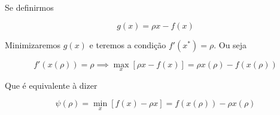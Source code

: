Se definirmos 

\[
	g(x) = \rho x - f(x)
\]

Minimizaremos $g(x)$ e teremos a condição $f'(x^*) = \rho$. Ou seja

\[
	f'(x(\rho))=\rho \implies \max_x[\rho x - f(x)] = \rho x(\rho) - f(x(\rho))
\]

Que é equivalente à dizer

\[
\psi(\rho) = \min_x[f(x) - \rho x] = f(x(\rho)) - \rho x(\rho)
\]
